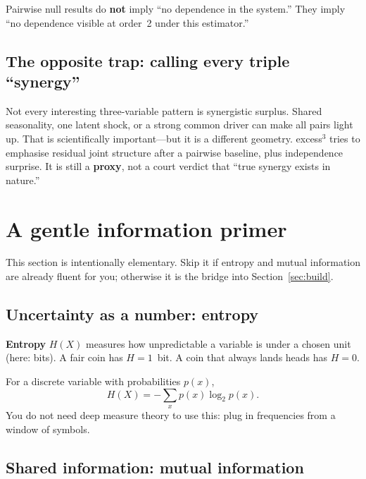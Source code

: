\documentclass[11pt,a4paper]{article}
\begin{document}
\begin{keyidea}
Pairwise null results do \textbf{not} imply ``no dependence in the
system.'' They imply ``no dependence visible at order~2 under this
estimator.''
\end{keyidea}

\subsection{The opposite trap: calling every triple ``synergy''}

Not every interesting three-variable pattern is synergistic surplus. Shared
seasonality, one latent shock, or a strong common driver can make all pairs
light up. That is scientifically important---but it is a different geometry.
excess$^3$ tries to emphasise residual joint structure after a pairwise
baseline, plus independence surprise. It is still a \textbf{proxy}, not a
court verdict that ``true synergy exists in nature.''

\section{A gentle information primer}
\label{sec:primer}

This section is intentionally elementary. Skip it if entropy and mutual
information are already fluent for you; otherwise it is the bridge into
Section~\ref{sec:build}.

\subsection{Uncertainty as a number: entropy}

\begin{defbox}
\textbf{Entropy} $H(X)$ measures how unpredictable a variable is under a
chosen unit (here: bits). A fair coin has $H=1$~bit. A coin that always
lands heads has $H=0$.
\end{defbox}

For a discrete variable with probabilities $p(x)$,
\begin{equation}
H(X)=-\sum_x p(x)\log_2 p(x).
\end{equation}
You do not need deep measure theory to use this: plug in frequencies from a
window of symbols.

\subsection{Shared information: mutual information}
\end{document}
